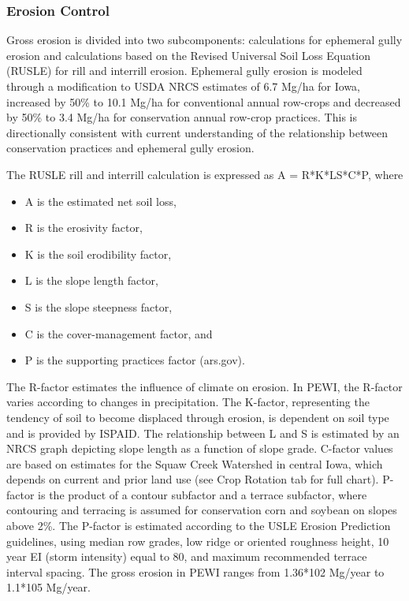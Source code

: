 \documentclass[11pt]{article}
\begin{document}
 
\cleardoublepage
\newpage

\subsubsection{Erosion Control}
Gross erosion is divided into two subcomponents: calculations for ephemeral gully erosion and calculations based on the Revised Universal Soil Loss Equation (RUSLE) for rill and interrill erosion.\cite{39}  Ephemeral gully erosion is modeled through a modification to USDA NRCS estimates of 6.7 Mg/ha for Iowa, increased by 50\% to 10.1 Mg/ha for conventional annual row-crops and decreased by 50\% to 3.4 Mg/ha for conservation annual row-crop practices. This is directionally consistent with current understanding of the relationship between conservation practices and ephemeral gully erosion.\cite{40} 

The RUSLE rill and interrill calculation is expressed as A = R*K*LS*C*P, where

\begin{itemize} 
\item A is the estimated net soil loss, 
\item R is the erosivity factor, 
\item K is the soil erodibility factor, 
\item L is the slope length factor, 
\item S is the slope steepness factor, 
\item C is the cover-management factor, and 
\item P is the supporting practices factor (ars.gov). 
\end{itemize}


The R-factor estimates the influence of climate on erosion. In PEWI, the R-factor varies according to changes in precipitation.\cite{41}  The K-factor, representing the tendency of soil to become displaced through erosion, is dependent on soil type and is provided by ISPAID.\cite{42}  The relationship between L and S is estimated by an NRCS graph depicting slope length as a function of slope grade.\cite{43}  C-factor values are based on estimates for the Squaw Creek Watershed in central Iowa, which depends on current and prior land use (see Crop Rotation tab for full chart). \cite{44} P-factor is the product of a contour subfactor and a terrace subfactor, where contouring and terracing is assumed for conservation corn and soybean on slopes above 2\%. The P-factor is estimated according to the USLE Erosion Prediction guidelines, using median row grades, low ridge or oriented roughness height, 10 year EI (storm intensity) equal to 80, and maximum recommended terrace interval spacing.\cite{45}  The gross erosion in PEWI ranges from 1.36*102 Mg/year to 1.1*105 Mg/year.
\end{document}
